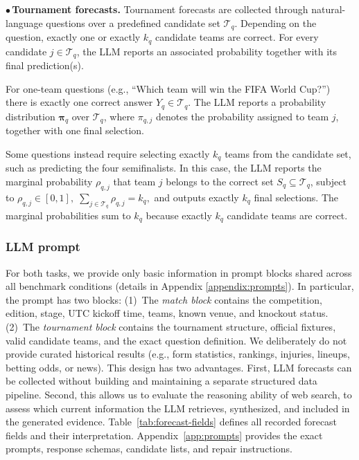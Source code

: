 \documentclass[sigconf,nonacm]{acmart}
\begin{document}
\textbf{$\bullet$\,Tournament forecasts.}
Tournament forecasts are collected through natural-language questions over a predefined candidate set $\mathcal{T}_q$. Depending on the question, exactly one or exactly $k_q$ candidate teams are correct. For every candidate $j \in \mathcal{T}_q$, the LLM reports an associated probability together with its final prediction(s).

For one-team questions (e.g., ``Which team will win the FIFA World Cup?'') there is exactly one correct answer $Y_q \in \mathcal{T}_q$. The LLM reports a probability distribution
$\boldsymbol{\pi}_q$ over $\mathcal{T}_q$, where $\pi_{q,j}$ denotes the probability assigned to team $j$, together with one final selection.

Some questions instead require selecting exactly $k_q$ teams from the candidate set, such as predicting the four semifinalists. In this case, the LLM reports the marginal probability $\rho_{q,j}$ that team $j$ belongs to the correct set $S_q \subseteq \mathcal{T}_q$, subject to
$\rho_{q,j} \in [0,1], \;
\sum_{j\in\mathcal{T}_q}\rho_{q,j}=k_q,$
and outputs exactly $k_q$ final selections. The marginal probabilities sum to $k_q$ because exactly $k_q$ candidate teams are correct.

\subsubsection{LLM prompt}
For both tasks, we provide only basic information in prompt blocks shared across all benchmark conditions (details in Appendix \ref{appendix:prompts}). In particular, the prompt has two blocks: (1)~The  \emph{match block} contains the competition, edition, stage, UTC kickoff time, teams, known venue, and knockout status. (2)~The \emph{tournament block} contains the tournament structure, official fixtures, valid candidate teams, and the exact question definition. We deliberately do not provide curated historical results (e.g., form statistics, rankings, injuries, lineups, betting odds, or news). This design has two advantages. First, LLM forecasts can be collected without building and maintaining a separate structured data pipeline. Second, this allows us to evaluate the reasoning ability of web search, to assess which current information the LLM retrieves, synthesized, and included in the  generated evidence. Table~\ref{tab:forecast-fields} defines all recorded forecast fields and their interpretation. Appendix~\ref{app:prompts} provides the exact prompts, response schemas, candidate lists, and repair instructions.
\end{document}
